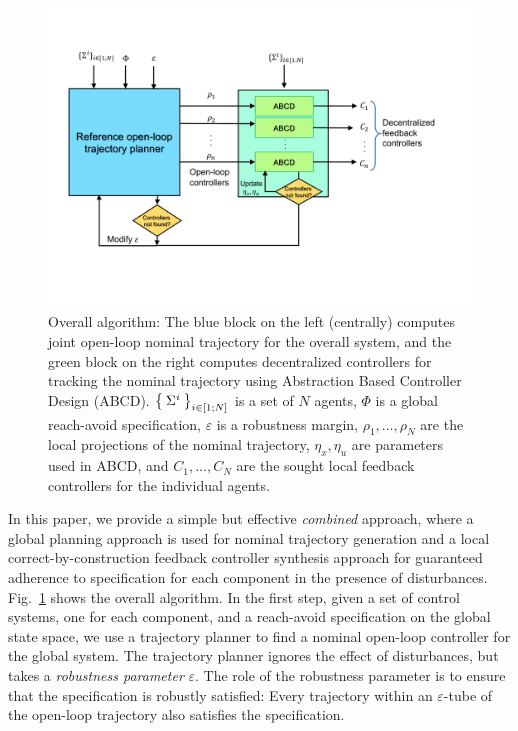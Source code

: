 \begin{figure}[t]
\includegraphics[width = \columnwidth]{figures/Algorithm_outline_updated.pdf}
\caption{Overall algorithm: The blue block on the left (centrally) computes joint open-loop nominal trajectory for the overall system, and the green block on the right computes decentralized controllers for tracking the nominal trajectory using Abstraction Based Controller Design (ABCD).
$\Set{\Sigma^i}_{i\in [1;N]}$ is a set of $N$ agents, $\Phi$ is a global reach-avoid specification, $\varepsilon$ is a robustness margin, $\rho_1,\ldots,\rho_N$ are the local projections of the nominal trajectory, $\eta_x,\eta_u$ are parameters used in ABCD, and $C_1,\ldots,C_N$ are the sought local feedback controllers for the individual agents.
}
\label{fig:overall}
\end{figure}

In this paper, we provide a simple but effective \emph{combined} approach, where a global planning approach is used for nominal trajectory generation and 
a local correct-by-construction feedback controller synthesis approach for guaranteed adherence to specification for each component
in the presence of disturbances.
Fig.~\ref{fig:overall} shows the overall algorithm.
In the first step, 
given a set of control systems, one for each component, and a reach-avoid specification on the global state space, we use a trajectory planner to
find a nominal open-loop controller for the global system.
The trajectory planner ignores the effect of disturbances, but takes a \emph{robustness parameter} $\varepsilon$.
The role of the robustness parameter is to ensure that the specification is robustly satisfied: 
Every trajectory within an $\varepsilon$-tube of the open-loop trajectory also satisfies the specification.

